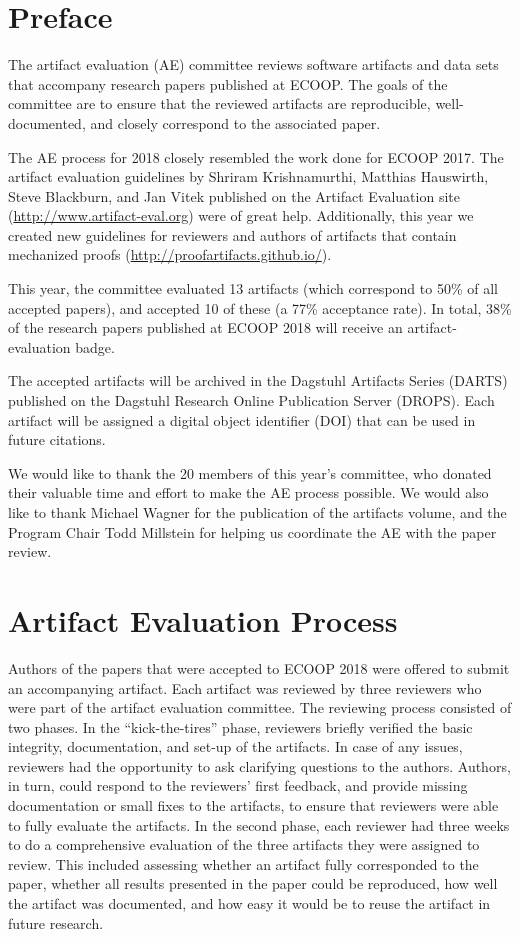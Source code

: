 \documentclass[a4paper,UKenglish]{dartsmaster}
\begin{document}
\chapter{Preface} %

The artifact evaluation (AE) committee reviews software artifacts and data sets that accompany research papers published at ECOOP. The goals of the committee are to ensure that the reviewed artifacts are reproducible, well-documented, and closely correspond to the associated paper. 

The AE process for 2018 closely resembled the work done for ECOOP 2017. The artifact evaluation guidelines by Shriram Krishnamurthi, Matthias
Hauswirth, Steve Blackburn, and Jan Vitek published on the Artifact
Evaluation site (\url{http://www.artifact-eval.org}) were of great help. Additionally, this year we created new guidelines for reviewers and authors of artifacts that contain mechanized proofs (\url{http://proofartifacts.github.io/}). 

This year, the committee evaluated 13 artifacts (which correspond to 50\% of all
accepted papers), and accepted 10 of these (a 77\% acceptance rate). In total, 38\% of the research papers published at ECOOP 2018 will receive an artifact-evaluation badge.

The accepted artifacts will be archived in the Dagstuhl Artifacts Series (DARTS) published on the Dagstuhl Research Online Publication Server (DROPS). Each artifact will be assigned a digital object identifier (DOI) that can be used in future citations. 

We would like to thank the 20 members of this year's committee, who donated their valuable time and effort to make the AE process possible. We would also like to thank  Michael Wagner for the publication of the artifacts volume, and the Program Chair Todd Millstein for helping us coordinate the AE with the paper review.

\chapter{Artifact Evaluation Process}
Authors of the papers that were accepted to ECOOP 2018 were offered to submit an accompanying artifact.
Each artifact was reviewed by three reviewers who were part of the artifact evaluation committee. 
The reviewing process consisted of two phases.
In the ``kick-the-tires'' phase, reviewers briefly verified the basic integrity, documentation, and set-up of the artifacts.
In case of any issues, reviewers had the opportunity to ask clarifying questions to the authors.
Authors, in turn, could respond to the reviewers' first feedback, and provide missing documentation
or small fixes to the artifacts, to ensure that reviewers were able to fully evaluate the artifacts.
In the second phase, each reviewer had three weeks to do a comprehensive evaluation of the three artifacts they were
assigned to review. This included assessing whether an artifact fully corresponded to the paper,
whether all results presented in the paper could be reproduced, how well the artifact was documented,
and how easy it would be to reuse the artifact in future research.
\end{document}
